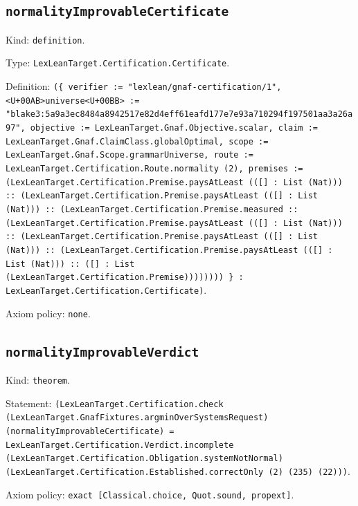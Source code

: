 \documentclass[11pt]{article}
\begin{document}
\subsection*{\texttt{normalityImprovableCertificate}}
\noindent Kind: \texttt{definition}.\par
\noindent Type: \texttt{LexLeanTarget.Certification.Certificate}.\par
\noindent Definition: \texttt{(\{ verifier := "lexlean/gnaf-certification/1", <U+00AB>universe<U+00BB> := "blake3:5a9a3ec8484a8942517e82d4eff61eafd177e7e93a710294f197501aa3a26a97", objective := LexLeanTarget.Gnaf.Objective.scalar, claim := LexLeanTarget.Gnaf.ClaimClass.globalOptimal, scope := LexLeanTarget.Gnaf.Scope.grammarUniverse, route := LexLeanTarget.Certification.Route.normality (2), premises := (LexLeanTarget.Certification.Premise.paysAtLeast (([] : List (Nat))) :: (LexLeanTarget.Certification.Premise.paysAtLeast (([] : List (Nat))) :: (LexLeanTarget.Certification.Premise.measured :: (LexLeanTarget.Certification.Premise.paysAtLeast (([] : List (Nat))) :: (LexLeanTarget.Certification.Premise.paysAtLeast (([] : List (Nat))) :: (LexLeanTarget.Certification.Premise.paysAtLeast (([] : List (Nat))) :: ([] : List (LexLeanTarget.Certification.Premise)))))))) \} : LexLeanTarget.Certification.Certificate)}.\par
\noindent Axiom policy: \texttt{none}.\par
\subsection*{\texttt{normalityImprovableVerdict}}
\noindent Kind: \texttt{theorem}.\par
\noindent Statement: \texttt{(LexLeanTarget.Certification.check (LexLeanTarget.GnafFixtures.argminOverSystemsRequest) (normalityImprovableCertificate) = LexLeanTarget.Certification.Verdict.incomplete (LexLeanTarget.Certification.Obligation.systemNotNormal) (LexLeanTarget.Certification.Established.correctOnly (2) (235) (22)))}.\par
\noindent Axiom policy: \texttt{exact [Classical.choice, Quot.sound, propext]}.\par
\end{document}
